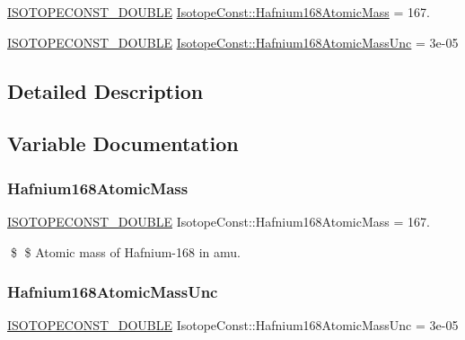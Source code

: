 \begin{DoxyCompactItemize}
\item 
\mbox{\hyperlink{group___isotope_const-_macros_ga8f45a7272ce02c0b4c65c44636ed719a}{I\+S\+O\+T\+O\+P\+E\+C\+O\+N\+S\+T\+\_\+\+D\+O\+U\+B\+LE}} \mbox{\hyperlink{group___isotope_const-_hafnium-_hf168_gabd06014c185dc4b6e317ec881ad8eb77}{Isotope\+Const\+::\+Hafnium168\+Atomic\+Mass}} = 167.
\item 
\mbox{\hyperlink{group___isotope_const-_macros_ga8f45a7272ce02c0b4c65c44636ed719a}{I\+S\+O\+T\+O\+P\+E\+C\+O\+N\+S\+T\+\_\+\+D\+O\+U\+B\+LE}} \mbox{\hyperlink{group___isotope_const-_hafnium-_hf168_ga47092bc2c4fad94ece71f23859796f51}{Isotope\+Const\+::\+Hafnium168\+Atomic\+Mass\+Unc}} = 3e-\/05
\end{DoxyCompactItemize}


\subsection{Detailed Description}


\subsection{Variable Documentation}
\mbox{\label{group___isotope_const-_hafnium-_hf168_gabd06014c185dc4b6e317ec881ad8eb77}} 
\subsubsection{\texorpdfstring{Hafnium168\+Atomic\+Mass}{Hafnium168AtomicMass}}
{\footnotesize\ttfamily \mbox{\hyperlink{group___isotope_const-_macros_ga8f45a7272ce02c0b4c65c44636ed719a}{I\+S\+O\+T\+O\+P\+E\+C\+O\+N\+S\+T\+\_\+\+D\+O\+U\+B\+LE}} Isotope\+Const\+::\+Hafnium168\+Atomic\+Mass = 167.}

\$ \$ Atomic mass of Hafnium-\/168 in amu. \mbox{\label{group___isotope_const-_hafnium-_hf168_ga47092bc2c4fad94ece71f23859796f51}} 
\subsubsection{\texorpdfstring{Hafnium168\+Atomic\+Mass\+Unc}{Hafnium168AtomicMassUnc}}
{\footnotesize\ttfamily \mbox{\hyperlink{group___isotope_const-_macros_ga8f45a7272ce02c0b4c65c44636ed719a}{I\+S\+O\+T\+O\+P\+E\+C\+O\+N\+S\+T\+\_\+\+D\+O\+U\+B\+LE}} Isotope\+Const\+::\+Hafnium168\+Atomic\+Mass\+Unc = 3e-\/05}

